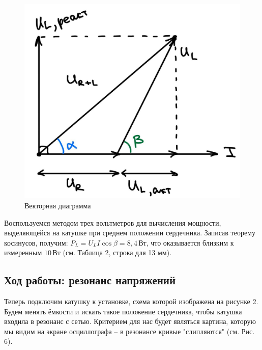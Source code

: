 \documentclass[a4paper, fontsize = 14pt]{article}
\begin{document}
\begin{figure}[hbt]
	\centering
	\includegraphics[scale=0.2]{lab48ris5.png}
	\caption{Векторная диаграмма}
\end{figure}

Воспользуемся методом трех вольтметров для вычисления мощности, выделяющейся на катушке при среднем положении сердечника. Записав теорему косинусов, получим: $P_L = U_L I \cos{\beta} = 8,4 \, Вт$, что оказывается близким к измеренным $10 \, Вт$ (см. Таблица 2, строка для 13 мм). 

\newpage

\subsection*{Ход работы: резонанс напряжений}

Теперь подключим катушку к установке, схема которой изображена на рисунке 2. Будем менять ёмкости и искать такое положение сердечника, чтобы катушка входила в резонанс с сетью. Критерием для нас будет являться картина, которую мы видим на экране осциллографа -- в резонансе кривые "слипляются" (см. Рис. 6).
\end{document}
